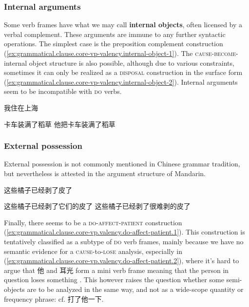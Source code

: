 \documentclass[UTF8, a4paper, oneside, scheme=plain, 12pt]{ctexrep}
\newcommand*{\concept}[1]{\textbf{#1}}
\newcommand*{\category}[1]{\textsc{#1}}
\begin{document}
\subsubsection{Internal arguments}\label{sec:grammatical.clause.core-vp.internal}

Some verb frames have what we may call \concept{internal objects}, often licensed by a verbal complement.
These arguments are immune to any further syntactic operations.
The simplest case is the preposition complement construction (\ref{ex:grammatical.clause.core-vp-valency.internal-object-1}).
The \category{cause}-\category{become}-internal object structure is also possible,
although due to various constraints, sometimes it can only be realized as a \category{disposal} construction in the surface form (\ref{ex:grammatical.clause.core-vp-valency.internal-object-2}).
Internal arguments seem to be incompatible with \category{do} verbs.

\begin{exe}
    \ex\label{ex:grammatical.clause.core-vp-valency.internal-object-1}
    我住在上海
    \ex\label{ex:grammatical.clause.core-vp-valency.internal-object-2} 
    \begin{xlist}
        \ex 卡车装满了稻草
        \ex 他把卡车装满了稻草
    \end{xlist}
\end{exe}

\subsubsection{External possession}

External possession is not commonly mentioned in Chinese grammar tradition,
but nevertheless is attested in the argument structure of Mandarin.

\begin{exe}
    \ex 这些橘子已经剥了皮了
    \ex\begin{xlist}
        \ex *这些橘子已经剥了它们的皮了
        \ex *这些橘子已经剥了很难剥的皮了
    \end{xlist}
\end{exe}

Finally, there seems to be a \category{do}-\category{affect}-\category{patient} construction
(\ref{ex:grammatical.clause.core-vp.valency.do-affect-patient.1}).
This construction is tentatively classified as a subtype of \category{do} verb frames,
mainly because we have no semantic evidence for a \category{cause}-to-\category{lose} analysis,
especially in (\ref{ex:grammatical.clause.core-vp.valency.do-affect-patient.2}),
where it's hard to argue that 他 and 耳光 form a mini verb frame meaning that the person in question loses something
\citep{huang2007}.
This however raises the question whether some semi-objects are to be analyzed in the same way,
and not as a wide-scope quantity or frequency phrase: cf. 打了他一下.
\end{document}
